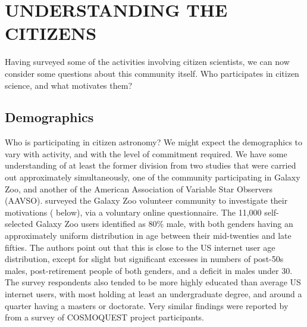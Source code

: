 \documentclass{ar2e}
\begin{document}



% 




\section{UNDERSTANDING THE CITIZENS}
\label{sec:crowd}

Having surveyed some of the activities involving citizen scientists, we can
now consider some questions about this community itself. Who participates in
citizen science, and what motivates them?



\subsection{Demographics}
\label{sec:crowd:demographics}

Who is participating in citizen astronomy? We might expect the demographics to
vary with activity, and with the level of commitment required. We have some
understanding of at least the former division from two studies that were
carried out approximately simultaneously, one of the community  participating
in Galaxy Zoo, and another of the American Association of Variable Star
Observers (AAVSO).  \citet{Rad++2013} surveyed the Galaxy Zoo volunteer
community to investigate their motivations (
below), via a voluntary online questionnaire. The 11,000 self-selected Galaxy
Zoo users identified as 80\% male, with both genders having an approximately
uniform distribution in age between their mid-twenties and late fifties. The
authors point out that this is close to the US internet user age distribution,
except for slight but significant excesses in numbers of post-50s males,
post-retirement people of both genders, and a deficit in males under 30. The
survey respondents  also tended to be more highly educated than average US
internet users, with most holding at least an undergraduate degree, and around
a quarter having a masters or doctorate. Very similar findings were reported
by \citet{COSMOQUESTsurvey} from a survey of COSMOQUEST project participants.
\end{document}
